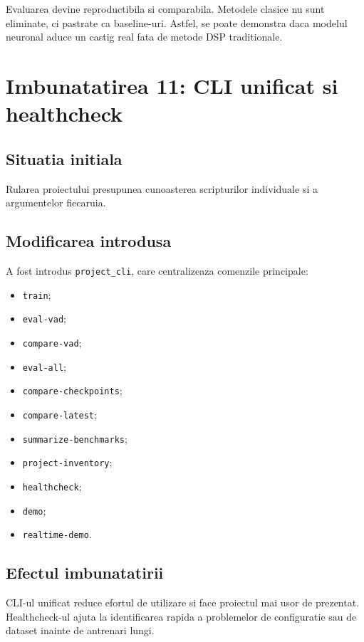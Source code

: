 \documentclass[12pt,a4paper]{article}
\begin{document}
Evaluarea devine reproductibila si comparabila. Metodele clasice nu sunt eliminate,
ci pastrate ca baseline-uri. Astfel, se poate demonstra daca modelul neuronal
aduce un castig real fata de metode DSP traditionale.

\section{Imbunatatirea 11: CLI unificat si healthcheck}

\subsection{Situatia initiala}

Rularea proiectului presupunea cunoasterea scripturilor individuale si a
argumentelor fiecaruia.

\subsection{Modificarea introdusa}

A fost introdus \texttt{project\_cli}, care centralizeaza comenzile principale:

\begin{itemize}
    \item \texttt{train};
    \item \texttt{eval-vad};
    \item \texttt{compare-vad};
    \item \texttt{eval-all};
    \item \texttt{compare-checkpoints};
    \item \texttt{compare-latest};
    \item \texttt{summarize-benchmarks};
    \item \texttt{project-inventory};
    \item \texttt{healthcheck};
    \item \texttt{demo};
    \item \texttt{realtime-demo}.
\end{itemize}

\subsection{Efectul imbunatatirii}

CLI-ul unificat reduce efortul de utilizare si face proiectul mai usor de
prezentat. Healthcheck-ul ajuta la identificarea rapida a problemelor de
configuratie sau de dataset inainte de antrenari lungi.
\end{document}
